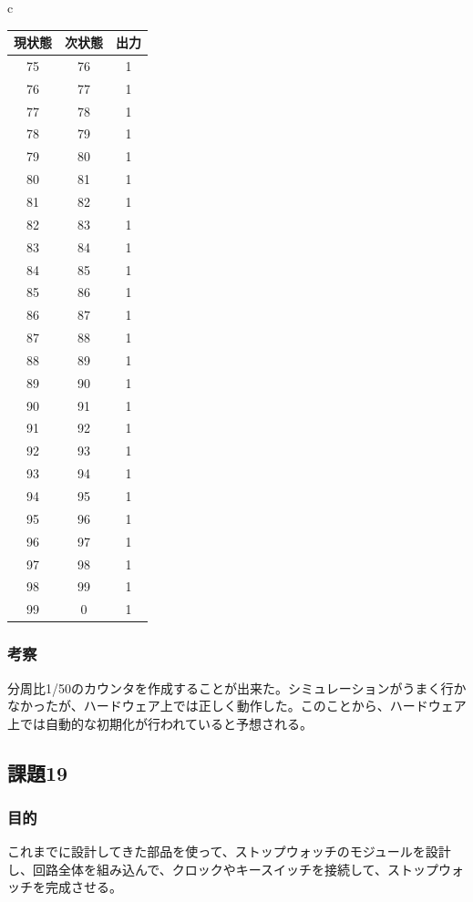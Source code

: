 \documentclass[a4paper]{jarticle}
\begin{document}
\begin{table}[H]
\begin{center}
\begin{tabular}{c}
\begin{minipage}{0.5\hsize}
\begin{center}
\begin{tabular}{|c|c|c|}
					\hline
					現状態	&次状態	&出力\\	\hline\hline
					75	&76	&1\\	\hline
					76	&77	&1\\	\hline
					77	&78	&1\\	\hline
					78	&79	&1\\	\hline
					79	&80	&1\\	\hline
					80	&81	&1\\	\hline
					81	&82	&1\\	\hline
					82	&83	&1\\	\hline
					83	&84	&1\\	\hline
					84	&85	&1\\	\hline
					85	&86	&1\\	\hline
					86	&87	&1\\	\hline
					87	&88	&1\\	\hline
					88	&89	&1\\	\hline
					89	&90	&1\\	\hline
					90	&91	&1\\	\hline
					91	&92	&1\\	\hline
					92	&93	&1\\	\hline
					93	&94	&1\\	\hline
					94	&95	&1\\	\hline
					95	&96	&1\\	\hline
					96	&97	&1\\	\hline
					97	&98	&1\\	\hline
					98	&99	&1\\	\hline
					99	&0	&1\\	\hline
					\end{tabular}
				\end{center}
			\end{minipage}
		\end{tabular}
	\end{center}
\end{table}
\subsubsection{考察}
分周比1/50のカウンタを作成することが出来た。シミュレーションがうまく行かなかったが、ハードウェア上では正しく動作した。このことから、ハードウェア上では自動的な初期化が行われていると予想される。
\subsection{課題19}
\subsubsection{目的}
これまでに設計してきた部品を使って、ストップウォッチのモジュールを設計し、回路全体を組み込んで、クロックやキースイッチを接続して、ストップウォッチを完成させる。
\end{document}
